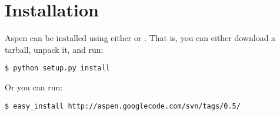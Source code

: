 \chapter{Installation \label{installation}}

Aspen can be installed using either  or .
That is, you can either download a tarball, unpack it, and run:

\begin{verbatim}
$ python setup.py install
\end{verbatim}

Or you can run:

\begin{verbatim}
$ easy_install http://aspen.googlecode.com/svn/tags/0.5/
\end{verbatim}
